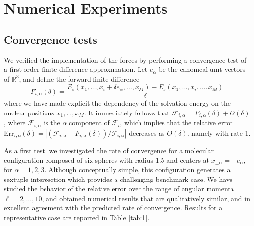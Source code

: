 \section{Numerical Experiments}\label{sec:experiments}
\subsection{Convergence tests}
We verified the implementation of the forces by performing a convergence test of a first order finite difference approximation. Let $e_\alpha$ be the canonical unit vectors of $\mathbb R^3$, and define the forward finite difference
\[
	F_{i,\alpha}(\delta)
	= 
	\frac{E_s(x_1,\ldots,x_i + \delta e_\alpha,\ldots,x_M) - E_s(x_1,\ldots,x_i,\ldots,x_M)}{\delta}
\]
where we have made explicit the dependency of the solvation energy on the nuclear positions $x_1 , \ldots , x_M$. It immediately follows that $\mathcal{F}_{i,\alpha} = F_{i,\alpha}(\delta) + O(\delta)$, where $\mathcal{F}_{i,\alpha}$ is the $\alpha$ component of $\mathcal{F}_i$, which implies that the relative error $\text{Err}_{i,\alpha}(\delta) = |(\mathcal{F}_{i,\alpha} - F_{i,\alpha}(\delta))/\mathcal{F}_{i,\alpha}|$ decreases as $O(\delta)$, namely with rate 1.

As a first test, we investigated the rate of convergence for a molecular configuration composed of six spheres with radius 1.5 and centers at $x_{\pm \alpha} = \pm e_\alpha$, for $\alpha = 1, 2,3$. Although conceptually simple, this configuration generates a sextuple intersection which provides a challenging benchmark case. We have studied the behavior of the relative error over the range of angular momenta $\ell = 2, \ldots , 10$, and obtained numerical results that are qualitatively similar, and in excellent agreement with the predicted rate of convergence. Results for a representative case are reported in Table \ref{tab:1}.


